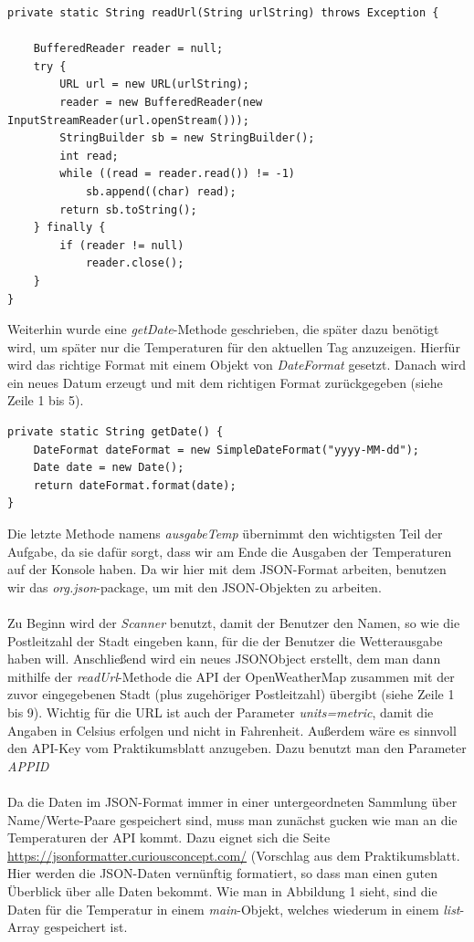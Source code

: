\begin{lstlisting}[caption={readUrl-Methode}]
private static String readUrl(String urlString) throws Exception {

	BufferedReader reader = null;
	try {
		URL url = new URL(urlString);
		reader = new BufferedReader(new InputStreamReader(url.openStream()));
		StringBuilder sb = new StringBuilder();
		int read;
		while ((read = reader.read()) != -1)
			sb.append((char) read);
		return sb.toString();
	} finally {
		if (reader != null)
			reader.close();
	}
}
\end{lstlisting}

Weiterhin wurde eine \textit{getDate}-Methode geschrieben, die später dazu benötigt wird, um später nur die Temperaturen für den aktuellen Tag anzuzeigen. Hierfür wird das richtige Format mit einem Objekt von \textit{DateFormat} gesetzt. Danach wird ein neues Datum erzeugt und mit dem richtigen Format zurückgegeben (siehe Zeile 1 bis 5).

\begin{lstlisting}[caption={getDate-Methode}]
private static String getDate() {
	DateFormat dateFormat = new SimpleDateFormat("yyyy-MM-dd");
	Date date = new Date();
	return dateFormat.format(date);
}
\end{lstlisting}

Die letzte Methode namens \textit{ausgabeTemp} übernimmt den wichtigsten Teil der Aufgabe, da sie dafür sorgt, dass wir am Ende die Ausgaben der Temperaturen auf der Konsole haben. Da wir hier mit dem JSON-Format arbeiten, benutzen wir das \textit{org.json}-package, um mit den JSON-Objekten zu arbeiten.\cite{[2]} \\
\\
Zu Beginn wird der \textit{Scanner} benutzt, damit der Benutzer den Namen, so wie die Postleitzahl der Stadt eingeben kann, für die der Benutzer die Wetterausgabe haben will. Anschließend wird ein neues JSONObject erstellt, dem man dann mithilfe der \textit{readUrl}-Methode die API der OpenWeatherMap zusammen mit der zuvor eingegebenen Stadt (plus zugehöriger Postleitzahl) übergibt (siehe Zeile 1 bis 9). Wichtig für die URL ist auch der Parameter \textit{units=metric}, damit die Angaben in Celsius erfolgen und nicht in Fahrenheit. Außerdem wäre es sinnvoll den API-Key vom Praktikumsblatt anzugeben. Dazu benutzt man den Parameter \textit{APPID}\\
\\
Da die Daten im JSON-Format immer in einer untergeordneten Sammlung über Name/Werte-Paare gespeichert sind, muss man zunächst gucken wie man an die Temperaturen der API kommt. Dazu eignet sich die Seite \url{https://jsonformatter.curiousconcept.com/} (Vorschlag aus dem Praktikumsblatt. Hier werden die JSON-Daten vernünftig formatiert, so dass man einen guten Überblick über alle Daten bekommt. Wie man in Abbildung 1 sieht, sind die Daten für die Temperatur in einem \textit{main}-Objekt, welches wiederum in einem \textit{list}-Array gespeichert ist. 

